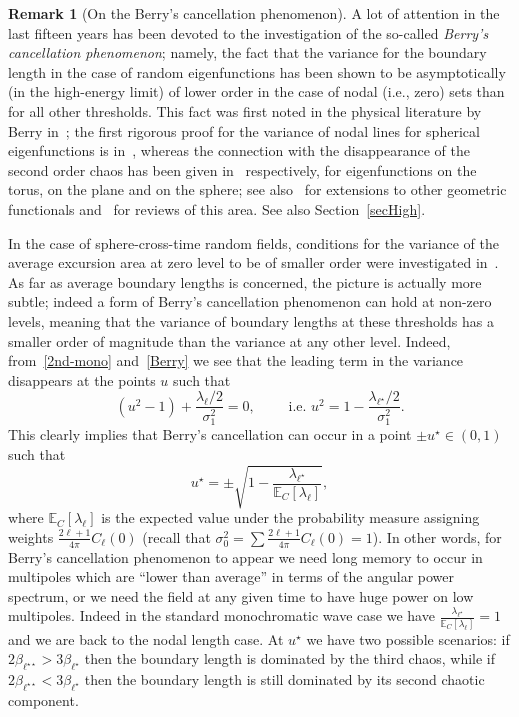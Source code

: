 \documentclass[10pt]{amsart}
\theoremstyle{definition}\newtheorem{defi}[theo]{Definition}\newtheorem{rema}[theo]{Remark}\newtheorem{exam}[theo]{Example}\newtheorem{exem}[theo]{Example}\newtheorem{nota}[theo]{Notation}
\newcommand{\bbE}{\mathbb{E}}
\begin{document}
\begin{rema}[On the Berry's cancellation phenomenon]
A lot of attention in the last fifteen years has been devoted to the investigation of the so-called \emph{Berry's cancellation phenomenon}; namely, the fact that the variance for the boundary length in the case of random eigenfunctions has been shown to be asymptotically (in the high-energy limit) of lower order in the case of nodal (i.e., zero) sets than for all other thresholds. This fact was first noted in the physical literature by Berry in~\cite{Ber02}; the first rigorous proof for the variance of nodal lines for spherical eigenfunctions is in~\cite{Wig}, whereas the connection with the disappearance of the second order chaos has been given in~\cite{MPRW16, MRW, NPR19} respectively, for eigenfunctions on the torus, on the plane and on the sphere; see also~\cite{CM2018} for extensions to other geometric functionals and~\cite{M2022,Rossi2018, Wig22} for reviews of this area. See also Section~\ref{secHigh}.

\noindent In the case of sphere-cross-time random fields, conditions for the variance of the average excursion area at zero level to be of smaller order were investigated in~\cite{MRV:20}. As far as average boundary lengths is concerned, the picture is actually more subtle; indeed a form of Berry's cancellation phenomenon can hold at non-zero levels, meaning that the variance of boundary lengths at these thresholds has a smaller order of magnitude than the variance at any other level. Indeed, from~\eqref{2nd-mono} and~\eqref{Berry} we see that the leading term in the variance disappears at the points $u$ such that
\begin{equation*}
\left(u^{2}-1\right)+\frac{\lambda _{\ell }/2}{\sigma _{1}^{2}}=0,\qquad\text{ i.e. } u^{2}=1-\frac{\lambda _{\ell ^{\star }}/2}{\sigma _{1}^{2}}\text{.}
\end{equation*}
This clearly implies that Berry's cancellation can occur in a point $\pm u^{\star }\in (0,1)$ such that
\begin{equation*}
u^{\star }=\pm \sqrt{1-\frac{\mathbb{\lambda }_{\ell ^{\star }}}{\bbE _{C}[\mathbb{\lambda }_{\ell }]}},
\end{equation*}
where $\bbE_{C}[\mathbb{\lambda }_{\ell }]$ is the expected value under the probability measure assigning weights $\frac{2\ell +1}{4\pi } C_{\ell }(0)$ (recall that $\sigma_0^2=\sum \frac{2\ell +1}{4\pi }C_{\ell }(0)=1$). In other words, for Berry's cancellation phenomenon to appear we need long memory to occur in multipoles which are ``lower than average'' in terms of the angular power spectrum, or we need the field at any given time to have huge power on low multipoles. Indeed in the standard monochromatic wave case we have $\frac{\mathbb{\lambda }_{\ell ^{\star }}}{\bbE_{C}[\mathbb{
\lambda }_{\ell }]}=1$ and we are back to the nodal length case. At $u^\star$ we have two possible scenarios: if $2\beta_{\ell^{\star\star}}>3\beta_{
\ell^{\star}}$ then the boundary length is dominated by the third chaos, while if $2\beta_{\ell^{\star\star}}<3\beta_{\ell^{\star}}$ then the boundary length is still dominated by its second chaotic component.
\end{rema}
\end{document}
